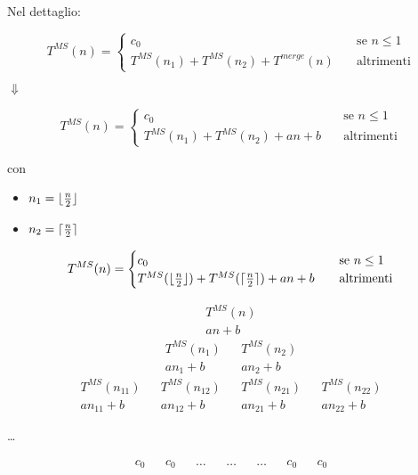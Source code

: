 Nel dettaglio: 

\[ T^{MS}(n) =
\begin{cases}
	c_0       & \quad \text{se } n \leq 1 \\
	T^{MS}(n_1)+T^{MS}(n_2)+T^{merge}(n)  & \quad \text{altrimenti}
\end{cases}
\]

\begin{center}
	$\Downarrow$ \\
\end{center}

\[ T^{MS}(n) =
\begin{cases}
c_0       & \quad \text{se } n \leq 1 \\
T^{MS}(n_1)+T^{MS}(n_2)+an+b  & \quad \text{altrimenti}
\end{cases}
\]

con 

\begin{itemize}
	\item[] $n_1 = \lfloor\frac{n}{2}\rfloor$
	\item[] $n_2 = \lceil\frac{n}{2}\rceil$
\end{itemize}

\[ T^{MS}(n) =
\begin{cases}
c_0       & \quad \text{se } n \leq 1 \\
T^{MS}(\lfloor\frac{n}{2}\rfloor)+T^{MS}(\lceil\frac{n}{2}\rceil)+an+b  & \quad \text{altrimenti}
\end{cases}
\]

\begin{preventpagebreak}
\begin{align*}
	T^{MS}(n) \\
	an+b
\end{align*}
\begin{align*}
	T^{MS}(n_1) && T^{MS}(n_2) \\
	an_1+b && an_2+b
\end{align*}
\begin{align*}
T^{MS}(n_{11}) && T^{MS}(n_{12}) && T^{MS}(n_{21}) && T^{MS}(n_{22}) \\
an_{11}+b && an_{12}+b && an_{21}+b && an_{22}+b
\end{align*}
\begin{center}
	\dots
\end{center}
\begin{align*}
	c_0 && c_0 && \dots && \dots && \dots && c_0 && c_0 \\
\end{align*}
\end{preventpagebreak}

